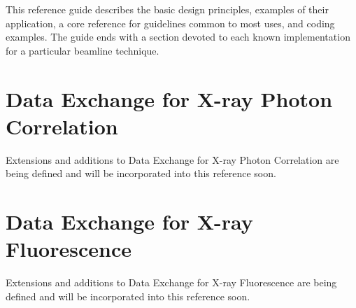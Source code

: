 \documentclass[usletter,11pt]{article}
\begin{document}
This reference guide describes the basic design principles, examples of their
application, a core reference for guidelines common to most uses, and coding
examples. The guide ends with a section devoted to each known implementation
for a particular beamline technique.



\newpage



\newpage



\newpage




\section{Data Exchange for X-ray Photon Correlation}

Extensions and additions to Data Exchange for X-ray Photon Correlation are being
defined and will be incorporated into this reference soon.


\section{Data Exchange for X-ray Fluorescence}

Extensions and additions to Data Exchange for X-ray Fluorescence are being defined
and will be incorporated into this reference soon.
\end{document}
